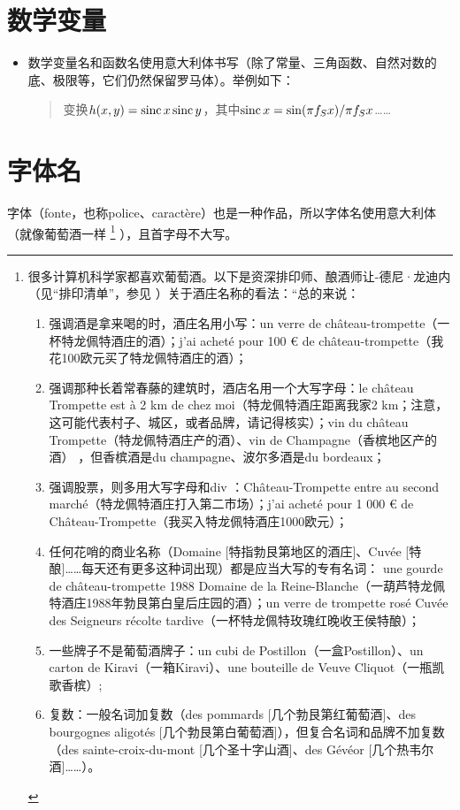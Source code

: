 \section{数学变量}

\begin{itemize}
    \item 数学变量名和函数名使用意大利体书写（除了常量、三角函数、自然对数的底、极限等，它们仍然保留罗马体）。举例如下：
    
    \begin{quote}
        变换$h(x, y) = {\rm sinc}\,x\,{\rm sinc}\,y$，其中$ {\rm sinc}\,x=\sin(\pi f_S x)/\pi f_S x$……
    \end{quote}
\end{itemize}

\section{字体名}

字体（fonte，也称police、caractère）也是一种作品，所以字体名使用意大利体（就像葡萄酒一样
    \footnote{很多计算机科学家都喜欢葡萄酒。以下是资深排印师、酿酒师让-德尼·龙迪内（见``排印清单''，参见%
    ）关于酒庄名称的看法：``总的来说：
    \begin{enumerate}[label=\alph*)]
        \item 强调酒是拿来喝的时，酒庄名用小写：un verre de château-trompette（一杯特龙佩特酒庄的酒）；j'ai acheté pour 100 € de château-trompette（我花100欧元买了特龙佩特酒庄的酒）；
        \item 强调那种长着常春藤的建筑时，酒店名用一个大写字母：le château Trompette est à 2 km de chez moi（特龙佩特酒庄距离我家2 km；注意，这可能代表村子、城区，或者品牌，请记得核实）；vin du château Trompette（特龙佩特酒庄产的酒）、vin de Champagne（香槟地区产的酒） ，但香槟酒是du champagne、波尔多酒是du bordeaux；
        \item 强调股票，则多用大写字母和div%
        ：Château-Trompette entre au second marché（特龙佩特酒庄打入第二市场）；j'ai acheté pour 1 000 € de Château-Trompette（我买入特龙佩特酒庄1000欧元）；
        \item 任何花哨的商业名称（Domaine [特指勃艮第地区的酒庄]、Cuvée [特酿]……每天还有更多这种词出现）都是应当大写的专有名词： une gourde de château-trompette 1988 Domaine de la Reine-Blanche（一葫芦特龙佩特酒庄1988年勃艮第白皇后庄园的酒）；un verre de trompette rosé Cuvée des Seigneurs récolte tardive（一杯特龙佩特玫瑰红晚收王侯特酿）；
        \item 一些牌子不是葡萄酒牌子：un cubi de Postillon（一盒Postillon）、un carton de Kiravi（一箱Kiravi）、une bouteille de Veuve Cliquot（一瓶凯歌香槟）;
        \item 复数：一般名词加复数（des pommards [几个勃艮第红葡萄酒]、des bourgognes aligotés [几个勃艮第白葡萄酒]），但复合名词和品牌不加复数（des sainte-croix-du-mont [几个圣十字山酒]、des Gévéor [几个热韦尔酒]……）。
    \end{enumerate}}
），且首字母不大写。

